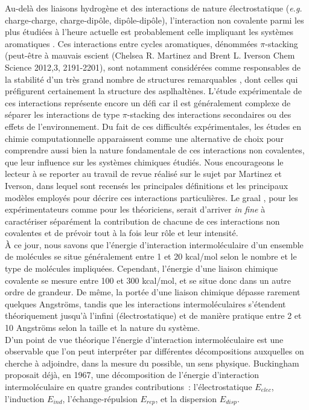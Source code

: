 	Au-delà des liaisons hydrogène et des interactions de nature électrostatique (\textit{e.g.} charge-charge, charge-dipôle, dipôle-dipôle), l’interaction non covalente parmi les plus étudiées à l’heure actuelle est probablement celle impliquant les systèmes aromatiques \cite{grimme2008special}. Ces interactions entre cycles aromatiques, dénommées \og $\pi$-stacking \fg{} (peut-être à mauvais escient (Chelsea R. Martinez and Brent L. Iverson Chem Science 2012,3, 2191-2201), sont notamment considérées comme responsables de la stabilité d’un très grand nombre de structures remarquables \cite{mcgaughey1998pi}, dont celles qui préfigurent certainement la structure des asplhaltènes. L’étude expérimentale de ces interactions représente encore un défi car il est généralement complexe de séparer les interactions de type $\pi$-stacking des interactions secondaires ou des effets de l’environnement. Du fait de ces difficultés expérimentales, les études en chimie computationnelle apparaissent comme une alternative de choix pour comprendre aussi bien la nature fondamentale de ces interactions non covalentes, que leur influence sur les systèmes chimiques étudiés. Nous encourageons le lecteur à se reporter au travail de revue réalisé sur le sujet par Martinez et Iverson, dans lequel sont recensés les principales définitions et les principaux modèles employés pour décrire ces interactions particulières.
	Le \og graal \fg{}, pour les expérimentateurs comme pour les théoriciens, serait d’arriver \textit{in fine} à caractériser séparément la contribution de chacune de ces interactions non covalentes et de prévoir tout à la fois leur rôle et leur intensité.\\
	
	À ce jour, nous savons que l’énergie d'interaction intermoléculaire d'un ensemble de molécules se situe généralement entre 1 et 20 kcal/mol selon le nombre et le type de molécules impliquées. Cependant, l'énergie d'une liaison chimique covalente se mesure entre 100 et 300 kcal/mol, et se situe donc dans un autre ordre de grandeur. De même, la portée d’une liaison chimique dépasse rarement quelques Angströms, tandis que les interactions intermoléculaires s'étendent théoriquement jusqu'à l'infini (électrostatique) et de manière pratique entre 2 et 10 Angströms selon la taille et la nature du système.\\
	
	D’un point de vue théorique l’énergie d’interaction intermoléculaire est une observable que l’on peut interpréter par différentes décompositions auxquelles on cherche à adjoindre, dans la mesure du possible, un sens physique. Buckingham \cite{buckingham1967permanent} proposait déjà, en 1967, une décomposition de l’énergie d’interaction intermoléculaire en quatre grandes contributions : l’électrostatique $E_{elec}$, l’induction $E_{ind}$, l’échange-répulsion $E_{rep}$, et la dispersion $E_{disp}$.\\
	
